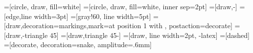 \newcommand{\cov}[2]{{#1}-{#2}-cover}
\newcommand{\pc}[1]{{#1}-path cover}
\newcommand{\match}{\ensuremath{M^*}}
\newcommand{\numpaths}{\ensuremath{\sigma_\mathrm{p}}}
\newcommand{\numcycles}{\ensuremath{\sigma_\mathrm{c}}}
\newcommand{\np}{\numpaths}
\newcommand{\nc}{\numcycles}
\newcommand{\lenpaths}{\ensuremath{\ell_\mathrm{p}}}
\newcommand{\lencycles}{\ensuremath{\ell_\mathrm{c}}}
\newcommand{\lbranch}{\ensuremath{\operatorname{lowbranch}}}
\newcommand{\ch}{\ensuremath{C}}
\newcommand{\chx}[1]{\ensuremath{c_{#1}}}
\newcommand{\parent}{\ensuremath{\operatorname{par}}}
\newcommand{\graphof}[1]{\ensuremath{\operatorname{Gr}(#1)}}
\newcommand{\argmin}{\ensuremath{\operatorname{argmin}}}
\newcommand{\eps}{\varepsilon}
\newcommand{\wmax}{\ensuremath{\w_{\max}}}
\newcommand{\wmin}{\ensuremath{\w_{\min}}}

\newcommand{\rod}[1]{\par\textcolor{red}{Rod : \textsc{#1}}\par}
\newcommand{\nini}[1]{\par\textcolor{blue}{Nini : \textsc{#1}}\par}
\newcommand{\mw}[1]{\todo{\textbf{MW:} #1}}

\usetikzlibrary{arrows,shapes,positioning,calc,decorations.pathreplacing,decorations.markings,decorations.pathmorphing,patterns}

\parskip=-1pt

=[circle, draw, fill=white]
=[circle, draw, fill=white, inner sep=2pt]
=[draw,-]
=[edge,line width=3pt]
=[gray!60, line width=5pt]
=[draw,decoration={markings,mark=at position 1 with {}}, postaction={decorate}]
=[draw,-triangle 45]
=[draw,triangle 45-]
=[draw, line width=2pt, -latex]
=[dashed]
=[decorate, decoration={snake, amplitude=.6mm}]

\newcommand\tikzvert[1]{
  \raisebox{-.5mm}{
  \hspace{-2mm}
  \begin{tikzpicture}
    \node[vertex, inner sep=.9mm, #1] {};
  \end{tikzpicture}
  \hspace{-2mm}
  }
}


